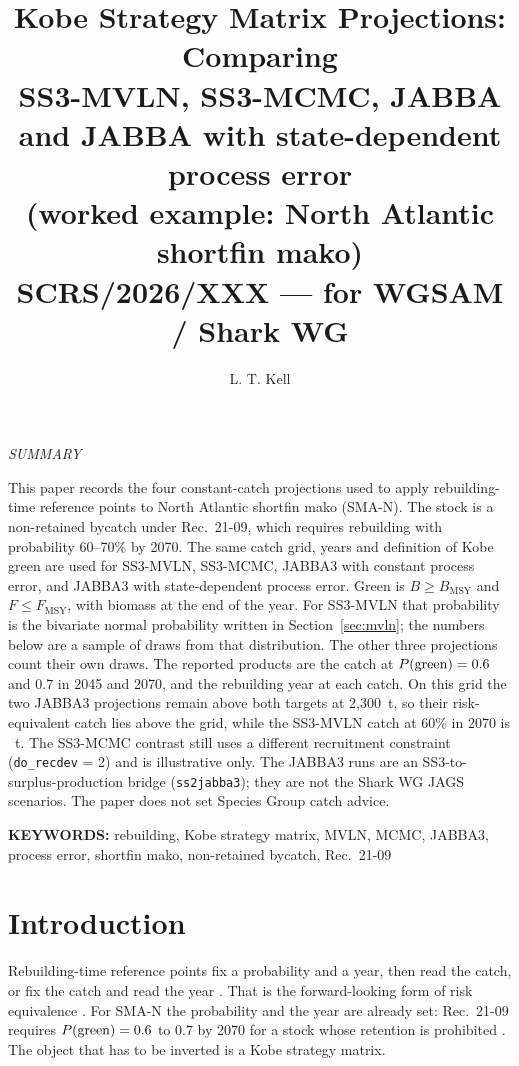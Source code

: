 \documentclass[11pt,a4paper]{article}
\title{\textbf{Kobe Strategy Matrix Projections: Comparing\\
SS3-MVLN, SS3-MCMC, JABBA and JABBA with state-dependent process error\\
\large (worked example: North Atlantic shortfin mako)}\\[0.5em]
\large SCRS/2026/XXX --- for WGSAM / Shark WG}
\author[1]{L. T. Kell}
\affil[1]{Centre for Environmental Policy, Imperial College London, London, United Kingdom.\\
\texttt{laurie@seaplusplus.co.uk}}
\begin{document}
\maketitle

\begin{center}\textit{SUMMARY}\end{center}

This paper records the four constant-catch projections used to apply
rebuilding-time reference points to North Atlantic shortfin mako (SMA-N).
The stock is a non-retained bycatch under Rec.~21-09, which requires
rebuilding with probability 60--70\% by 2070. The same catch grid, years and
definition of Kobe green are used for SS3-MVLN, SS3-MCMC, JABBA3 with
constant process error, and JABBA3 with state-dependent process error. Green
is $B \ge B_{\mathrm{MSY}}$ and $F \le F_{\mathrm{MSY}}$, with biomass at the
end of the year. For SS3-MVLN that probability is the bivariate normal
probability written in Section~\ref{sec:mvln}; the numbers below are a
sample of \nDraw{} draws from that distribution. The other three
projections count their own draws. The reported products
are the catch at $P(\mathrm{green}) = 0.6$ and $0.7$ in 2045 and 2070, and the rebuilding
year at each catch. On this grid the two JABBA3 projections remain above both
targets at 2{,}300~t, so their risk-equivalent catch lies above the grid,
while the SS3-MVLN catch at 60\% in 2070 is \tacMvlnSeventySixty~t. The
SS3-MCMC contrast still uses a different recruitment constraint
(\texttt{do\_recdev} = 2) and is illustrative only. The JABBA3 runs are an
SS3-to-surplus-production bridge (\texttt{ss2jabba3}); they are not the Shark
WG JAGS scenarios. The paper does not set Species Group catch advice.

\textbf{KEYWORDS:} rebuilding, Kobe strategy matrix, MVLN, MCMC, JABBA3,
process error, shortfin mako, non-retained bycatch, Rec.~21-09

\section{Introduction}

Rebuilding-time reference points fix a probability and a year, then read the
catch, or fix the catch and read the year \citep{KellAcceptedFaF}. That is
the forward-looking form of risk equivalence \citep{Fischer2023}. For SMA-N
the probability and the year are already set: Rec.~21-09 requires $P(\mathrm{green}) = 0.6$
to $0.7$ by 2070 for a stock whose retention is prohibited
\citep{ICCAT2021Rec2109,ICCAT2022Rec2211}. The object that has to be inverted
is a Kobe strategy matrix.
\end{document}
